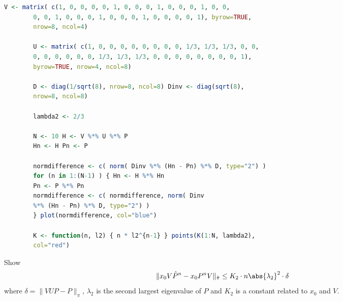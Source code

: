 \documentclass[12pt]{article}
\begin{document}
\begin{solution}
\begin{lstlisting}[language=R]
        V <- matrix( c(1, 0, 0, 0, 0, 1, 0, 0, 0, 1, 0, 0, 0, 1, 0, 0,
        0, 0, 1, 0, 0, 0, 1, 0, 0, 0, 1, 0, 0, 0, 0, 1), byrow=TRUE,
        nrow=8, ncol=4)

        U <- matrix( c(1, 0, 0, 0, 0, 0, 0, 0, 0, 1/3, 1/3, 1/3, 0, 0,
        0, 0, 0, 0, 0, 0, 1/3, 1/3, 1/3, 0, 0, 0, 0, 0, 0, 0, 0, 1),
        byrow=TRUE, nrow=4, ncol=8)

        D <- diag(1/sqrt(8), nrow=8, ncol=8) Dinv <- diag(sqrt(8),
        nrow=8, ncol=8)

        lambda2 <- 2/3

        N <- 10 H <- V %*% U %*% P
        Hn <- H Pn <- P

        normdifference <- c( norm( Dinv %*% (Hn - Pn) %*% D, type="2") )
        for (n in 1:(N-1) ) { Hn <- H %*% Hn
        Pn <- P %*% Pn
        normdifference <- c( normdifference, norm( Dinv
        %*% (Hn - Pn) %*% D, type="2") )
        } plot(normdifference, col="blue")

        K <- function(n, l2) { n * l2^{n-1} } points(K(1:N, lambda2),
        col="red")
    \end{lstlisting}
\end{solution}

\begin{exercise}
    Show
    \[
        \| x_0 V \hat{P}^n - x_0 P^n V \|_{\hat{\pi}} \le K_2 \cdot n
        \abs{\lambda_2}^2 \cdot \delta
    \] where \( \delta = \| VUP - P \|_{\pi} \), \( \lambda_2 \) is the
    second largest eigenvalue of \( P \) and \( K_2 \) is a constant
    related to \( x_0 \) and \( V \).
\end{exercise}
\begin{solution}

\end{solution}

\hr

\end{document}
